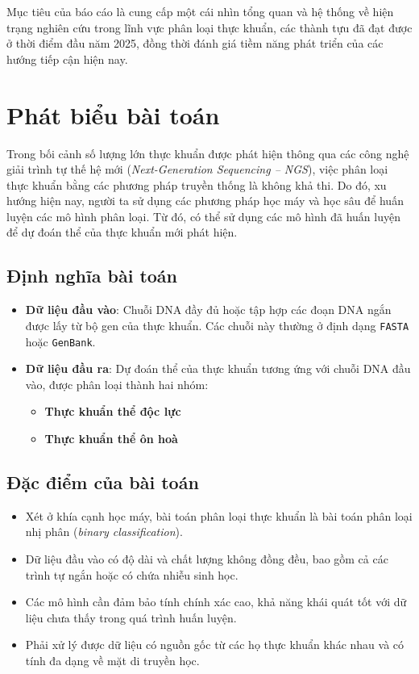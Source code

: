 Mục tiêu của báo cáo là cung cấp một cái nhìn tổng quan và hệ thống về hiện trạng nghiên cứu trong lĩnh vực phân loại thực khuẩn, các thành tựu đã đạt được ở thời điểm đầu năm 2025, đồng thời đánh giá tiềm năng phát triển của các hướng tiếp cận hiện nay.


\section{Phát biểu bài toán}

Trong bối cảnh số lượng lớn thực khuẩn được phát hiện thông qua các công nghệ giải trình tự thế hệ mới (\textit{Next-Generation Sequencing – NGS}), việc phân loại thực khuẩn bằng các phương pháp truyền thống là không khả thi. Do đó, xu hướng hiện nay, người ta sử dụng các phương pháp học máy và học sâu để huấn luyện các mô hình phân loại. Từ đó, có thể sử dụng các mô hình đã huấn luyện để dự đoán thể của thực khuẩn mới phát hiện.

\subsection{Định nghĩa bài toán}

\begin{itemize}
    \item \textbf{Dữ liệu đầu vào}: Chuỗi DNA đầy đủ hoặc tập hợp các đoạn DNA ngắn được lấy từ bộ gen của thực khuẩn. Các chuỗi này thường ở định dạng \texttt{FASTA} hoặc \texttt{GenBank}.
    \item \textbf{Dữ liệu đầu ra}: Dự đoán thể của thực khuẩn tương ứng với chuỗi DNA đầu vào, được phân loại thành hai nhóm:
    \begin{itemize}
        \item \textbf{Thực khuẩn thể độc lực}
        \item \textbf{Thực khuẩn thể ôn hoà}
    \end{itemize}
\end{itemize}

\subsection{Đặc điểm của bài toán}

\begin{itemize}
    \item Xét ở khía cạnh học máy, bài toán phân loại thực khuẩn là bài toán phân loại nhị phân (\textit{binary classification}).
    \item Dữ liệu đầu vào có độ dài và chất lượng không đồng đều, bao gồm cả các trình tự ngắn hoặc có chứa nhiễu sinh học.
    \item Các mô hình cần đảm bảo tính chính xác cao, khả năng khái quát tốt với dữ liệu chưa thấy trong quá trình huấn luyện.
    \item Phải xử lý được dữ liệu có nguồn gốc từ các họ thực khuẩn khác nhau và có tính đa dạng về mặt di truyền học.
\end{itemize}

